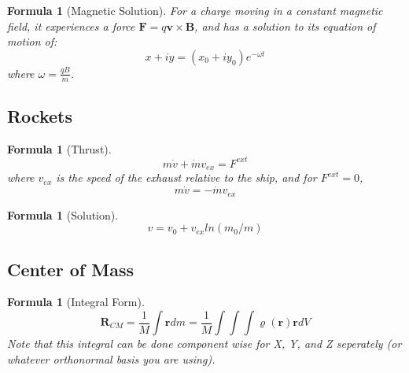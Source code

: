 \documentclass[12pt]{article}
\newtheorem{for}[thm]{Formula}
\theoremstyle{definition}
\theoremstyle{remark}
\numberwithin{equation}{section}
\newcommand\B[1]{\textbf{#1}}
\begin{document}
\begin{for}[Magnetic Solution]
        For a charge moving in a constant magnetic field, it experiences a force $\B{F} = q\B{v}\times\B{B}$, and has a solution to its equation of motion of:
        \begin{equation}
                x+iy = (x_0+iy_0)e^{-\omega t}
        \end{equation}
        where $\omega = \frac{qB}{m}$.
\end{for}


\vspace{15pt}

\subsection{Rockets}


\begin{for}[Thrust]
        \begin{equation}
                m\dot{v}+\dot{m}v_{ex} = F^{ext}
        \end{equation}
        where $v_{ex}$ is the speed of the exhaust relative to the ship, and for $F^{ext} = 0$, \begin{equation}
                m\dot{v} = -\dot{m}v_{ex}
        \end{equation}
\end{for}

\vspace{15pt}


\begin{for}[Solution]
        \begin{equation}
                v = v_0+v_{ex}ln(m_0/m)
        \end{equation}
\end{for}



\vspace{15pt}

\subsection{Center of Mass}


\begin{for}[Integral Form]
        \begin{equation}
                \B{R}_{CM} = \frac{1}{M}\int\B{r}dm = \frac{1}{M}\int\int\int\boldsymbol{\varrho(r)}\B{r}dV
        \end{equation}
        Note that this integral can be done component wise for X, Y, and Z seperately (or whatever orthonormal basis you are using).
\end{for}
\end{document}
